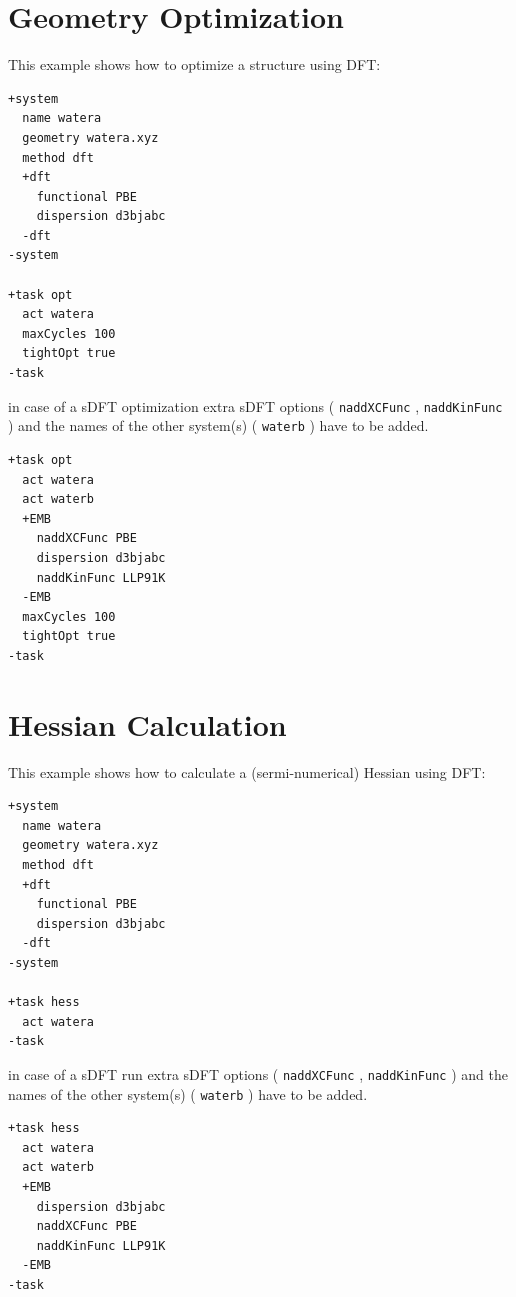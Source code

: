 \documentclass[bibliography=totocnumbered,a4paper,10pt,oneside]{scrbook}
\newcommand{\ttt}[1]{%
  \begingroup\setlength{\fboxsep}{1pt}%
  \colorbox{serenity-green!30}{\texttt{\hspace*{2pt}\vphantom{(g}#1\hspace*{2pt}}}%
  \endgroup
}
\begin{document}
\section{Geometry Optimization}
This example shows how to optimize a structure using DFT:
\begin{lstlisting}
+system
  name watera
  geometry watera.xyz
  method dft
  +dft
    functional PBE
    dispersion d3bjabc
  -dft
-system

+task opt
  act watera
  maxCycles 100
  tightOpt true
-task
\end{lstlisting}
in case of a sDFT optimization extra sDFT options (\ttt{naddXCFunc},\ttt{naddKinFunc}) and the names of the other system(s) (\ttt{waterb}) have to be added.
\begin{lstlisting}
+task opt
  act watera
  act waterb
  +EMB
    naddXCFunc PBE
    dispersion d3bjabc
    naddKinFunc LLP91K
  -EMB
  maxCycles 100
  tightOpt true
-task
\end{lstlisting}

\section{Hessian Calculation}
This example shows how to calculate a (sermi-numerical) Hessian using DFT:
\begin{lstlisting}
+system
  name watera
  geometry watera.xyz
  method dft
  +dft
    functional PBE
    dispersion d3bjabc
  -dft
-system

+task hess
  act watera
-task

\end{lstlisting}
in case of a sDFT run extra sDFT options (\ttt{naddXCFunc}, \ttt{naddKinFunc}) and the names of the other system(s) (\ttt{waterb}) have to be added.
\begin{lstlisting}
+task hess
  act watera
  act waterb
  +EMB
    dispersion d3bjabc
    naddXCFunc PBE
    naddKinFunc LLP91K
  -EMB
-task
\end{lstlisting}
\end{document}
